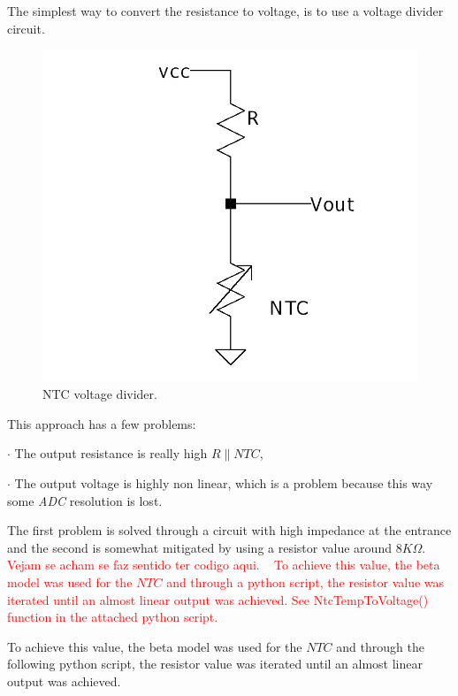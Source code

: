 \documentclass[12pt]{article}
\begin{document}
    The simplest way to convert the resistance to voltage, is to use a voltage divider circuit.

   \begin{figure}[H] 
        \centering
        \includegraphics*[scale = 0.25]{images/voltagedivider.png}
        \caption{NTC voltage divider.}
        \label{wrap-fig:1}
    \end{figure}

    This approach  has a few problems: 

    $\cdot$ The output resistance is really high $R\parallel NTC$, 

    $\cdot$ The output voltage is highly non linear, which is a problem because this way some \textit{ADC} resolution is lost.

    The first problem is solved through a circuit with high impedance at the entrance and the second is somewhat mitigated by using a resistor value around $8K \Omega$. 
    \textcolor{red}{Vejam se acham se faz sentido ter codigo aqui. ~ To achieve this value, the beta model was used for the $NTC$ and through a python script, the resistor value was iterated until an almost linear output was achieved. See NtcTempToVoltage() function in the attached python script.}
    
    To achieve this value, the beta model was used for the $NTC$ and through the following python script, the resistor value was iterated until an almost linear output was achieved. 
\end{document}
